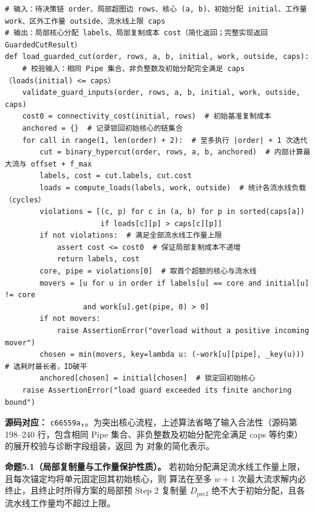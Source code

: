 \documentclass[anonymous,notoc]{gmcm2026}
\begin{document}
\FloatBarrier
\begin{algorithm}[!htbp]
\caption{受工作量保护的二核心局部超图割算法}\label{alg:p2-load-guarded-cut}
\small


\begin{lstlisting}[style=paperpseudo]
# 输入：待决策链 order、局部超图边 rows、核心 (a, b)、初始分配 initial、工作量 work、区外工作量 outside、流水线上限 caps
# 输出：局部核心分配 labels、局部复制成本 cost（简化返回；完整实现返回 GuardedCutResult）
def load_guarded_cut(order, rows, a, b, initial, work, outside, caps):
    # 校验输入：相同 Pipe 集合、非负整数及初始分配完全满足 caps（loads(initial) <= caps）
    validate_guard_inputs(order, rows, a, b, initial, work, outside, caps)
    cost0 = connectivity_cost(initial, rows)  # 初始基准复制成本
    anchored = {}  # 记录锁回初始核心的链集合
    for call in range(1, len(order) + 2):  # 至多执行 |order| + 1 次迭代
        cut = binary_hypercut(order, rows, a, b, anchored)  # 内部计算最大流与 offset + f_max
        labels, cost = cut.labels, cut.cost
        loads = compute_loads(labels, work, outside)  # 统计各流水线负载（cycles）
        violations = [(c, p) for c in (a, b) for p in sorted(caps[a])
                      if loads[c][p] > caps[c][p]]
        if not violations:  # 满足全部流水线工作量上限
            assert cost <= cost0  # 保证局部复制成本不递增
            return labels, cost
        core, pipe = violations[0]  # 取首个超额的核心与流水线
        movers = [u for u in order if labels[u] == core and initial[u] != core
                  and work[u].get(pipe, 0) > 0]
        if not movers:
            raise AssertionError("overload without a positive incoming mover")
        chosen = min(movers, key=lambda u: (-work[u][pipe], _key(u)))  # 选耗时最长者，ID破平
        anchored[chosen] = initial[chosen]  # 锁定回初始核心
    raise AssertionError("load guard exceeded its finite anchoring bound")
\end{lstlisting}
\textbf{源码对应：} \texttt{c66559a}，\texttt{}。为突出核心流程，上述算法省略了输入合法性（源码第 198--240 行，包含相同 Pipe 集合、非负整数及初始分配完全满足 caps 等约束）的展开校验与诊断字段组装，返回 \texttt{} 为 \texttt{} 对象的简化表示。

\end{algorithm}
\FloatBarrier

\textbf{命题5.1（局部复制量与工作量保护性质）。} 若初始分配满足流水线工作量上限，且每次锚定均将单元固定回其初始核心，则 \texttt{} 算法在至多 \(w + 1\) 次最大流求解内必终止，且终止时所得方案的局部预 Step 2 复制量 \(D_{\mathrm{pre2}}\) 绝不大于初始分配，且各流水线工作量均不超过上限。
\end{document}

